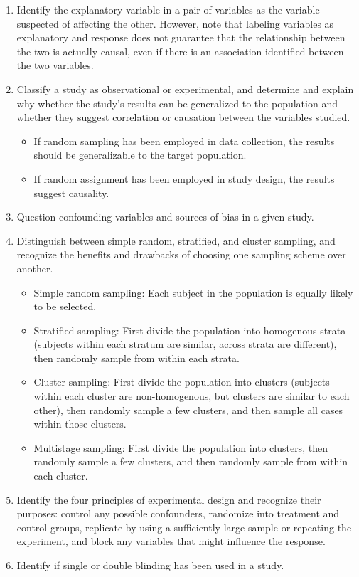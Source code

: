 \documentclass[11pt]{article}
\begin{document}
\begin{enumerate}[resume]
\renewcommand\labelenumi{\textcolor{light}{\textbf{LO \theenumi.}}}
\item Identify the explanatory variable in a pair of variables as the variable suspected of affecting the other. However, note that labeling variables as explanatory and response does not guarantee that the relationship between the two is actually causal, even if there is an association identified between the two variables. 
\item Classify a study as observational or experimental, and determine and explain why whether the study's results can be generalized to the population and whether they suggest correlation or causation between the variables studied.
\begin{itemize}
\renewcommand{\labelitemi}{{\textcolor{dark}{{\tiny $\blacksquare$}}}}
\item If random sampling has been employed in data collection, the results should be generalizable to the target population.
\item If random assignment has been employed in study design, the results suggest causality.
\end{itemize}
\item Question confounding variables and sources of bias in a given study.
\item Distinguish between simple random, stratified, and cluster sampling, and recognize the benefits and drawbacks of choosing one sampling scheme over another.
\begin{itemize}
\renewcommand{\labelitemi}{{\textcolor{dark}{{\tiny $\blacksquare$}}}}
\item Simple random sampling: Each subject in the population is equally likely to be selected.
\item Stratified sampling: First divide the population into homogenous strata (subjects within each stratum are similar, across strata are different), then randomly sample from within each strata.
\item Cluster sampling: First divide the population into clusters (subjects within each cluster are non-homogenous, but clusters are similar to each other), then randomly sample a few clusters, and then sample all cases within those clusters. 
\item Multistage sampling: First divide the population into clusters, then randomly sample a few clusters, and then randomly sample from within each cluster. 
\end{itemize}
\item Identify the four principles of experimental design and recognize their purposes: control any possible confounders, randomize into treatment and control groups, replicate by using a sufficiently large sample or repeating the experiment, and block any variables that might influence the response.
\item Identify if single or double blinding has been used in a study.
\end{enumerate}
\end{document}
